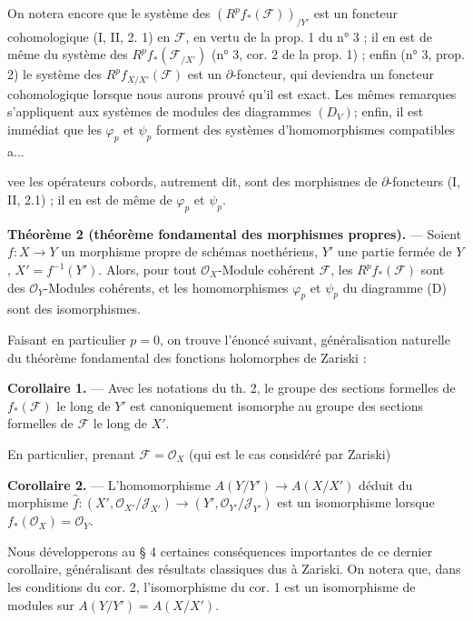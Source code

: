 On notera encore que le système des $(R^p f_* (\mathcal{F}))_{/Y'}$ est un foncteur cohomologique (I, II, 2. 1) en $\mathcal{F}$, en vertu de la prop. 1 du n° 3 ; il en est de même du système des $R^p f_* (\mathcal{F}_{/X'})$ (n° 3, cor. 2 de la prop. 1) ; enfin (n° 3, prop. 2) le système des $R^p f_{X/X'} (\mathcal{F})$ est un $\partial$-foncteur, qui deviendra un foncteur cohomologique lorsque nous aurons prouvé qu'il est exact. Les mêmes remarques s'appliquent aux systèmes de modules des diagrammes $(D_V)$; enfin, il est immédiat que les $\varphi_p$ et $\psi_p$ forment des systèmes d'homomorphismes compatibles a...

\newpage


\noindent{}

\noindent vee les opérateurs cobords, autrement dit, sont des morphismes de $\partial$-foncteurs (I, II, 2.1) ; il en est de même de $\varphi_p$ et $\psi_p$.

\noindent \textbf{Théorème 2 (théorème fondamental des morphismes propres).} --- Soient $f: X \to Y$ un morphisme propre de schémas noethériens, $Y'$ une partie fermée de $Y$, $X' = f^{-1}(Y')$. Alors, pour tout $\mathcal{O}_X$-Module cohérent $\mathcal{F}$, les $R^p f_*(\mathcal{F})$ sont des $\mathcal{O}_Y$-Modules cohérents, et les homomorphismes $\varphi_p$ et $\psi_p$ du diagramme (D) sont des isomorphismes.

\noindent Faisant en particulier $p=0$, on trouve l'énoncé suivant, généralisation naturelle du théorème fondamental des fonctions holomorphes de Zariski :

\noindent \textbf{Corollaire 1.} --- Avec les notations du th. 2, le groupe des sections formelles de $f_*(\mathcal{F})$ le long de $Y'$ est canoniquement isomorphe au groupe des sections formelles de $\mathcal{F}$ le long de $X'$.

\noindent En particulier, prenant $\mathcal{F} = \mathcal{O}_X$ (qui est le cas considéré par Zariski)

\noindent \textbf{Corollaire 2.} --- L'homomorphisme $A(Y/Y') \to A(X/X')$ déduit du morphisme $\hat{f}: (X', \mathcal{O}_{X'}/\mathcal{J}_{X'}) \to (Y', \mathcal{O}_{Y'}/\mathcal{J}_{Y'})$ est un isomorphisme lorsque $f_*(\mathcal{O}_X) = \mathcal{O}_Y$.

\noindent Nous développerons au § 4 certaines conséquences importantes de ce dernier corollaire, généralisant des résultats classiques dus à Zariski. On notera que, dans les conditions du cor. 2, l'isomorphisme du cor. 1 est un isomorphisme de modules sur $A(Y/Y') = A(X/X')$.

